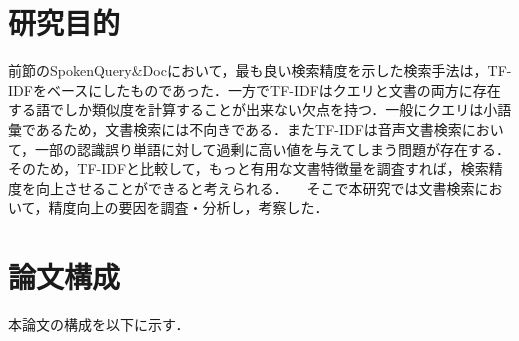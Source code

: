 \section{研究目的}
前節のSpokenQuery\&Docにおいて，最も良い検索精度を示した検索手法は，TF-IDFをベースにしたものであった．一方でTF-IDFはクエリと文書の両方に存在する語でしか類似度を計算することが出来ない欠点を持つ．一般にクエリは小語彙であるため，文書検索には不向きである．またTF-IDFは音声文書検索において，一部の認識誤り単語に対して過剰に高い値を与えてしまう問題が存在する．そのため，TF-IDFと比較して，もっと有用な文書特徴量を調査すれば，検索精度を向上させることができると考えられる．
　そこで本研究では文書検索において，精度向上の要因を調査・分析し，考察した．

\section{論文構成}
\noindent
本論文の構成を以下に示す．\\

